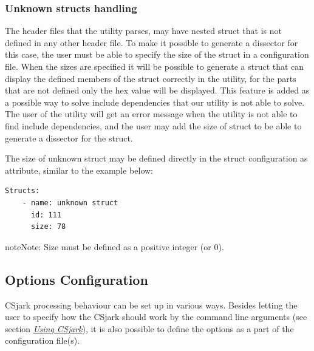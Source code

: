 \documentclass[A4paper,10pt,english]{sphinxmanual}
\begin{document}
\subsubsection{Unknown structs handling}
\label{user/config:unknown-structs-handling}
The header files that the utility parses, may have nested struct that is not defined in any other header file. To make  it possible to generate a dissector for this case, the user must be able to specify the size of the struct in a configuration file. When the sizes are specified it will be possible to generate a struct that can display the defined members of the struct correctly in the utility, for the parts that are not defined only the hex value will be displayed. This feature is added as a possible way to solve include dependencies that our utility is not able to solve. The user of the utility will get an error message when the utility is not able to find include dependencies, and the user may add the size of struct to be able to generate a dissector for the struct.

The size of unknown struct may be defined directly in the struct configuration as  attribute, similar to the example below:

\begin{Verbatim}[commandchars=\\\{\}]
Structs:
    - name: unknown struct
      id: 111
      size: 78
\end{Verbatim}

\begin{notice}{note}{Note:}
Size must be defined as a positive integer (or 0).
\end{notice}


\subsection{Options Configuration}
\label{user/config:options-configuration}
CSjark processing behaviour can be set up in various ways. Besides letting the user to specify how the CSjark should work by the command line arguments (see section {\hyperref[user/use:use]{\emph{Using CSjark}}}), it is also possible to define the options as a part of the configuration file(s).
\end{document}
